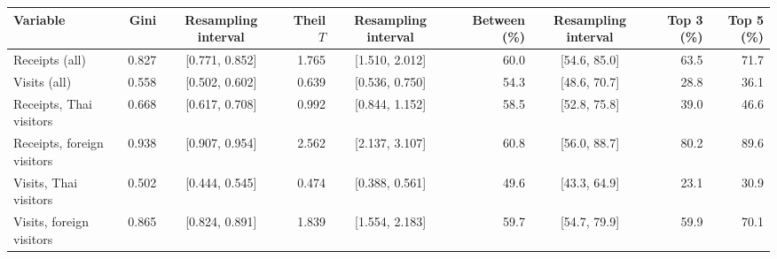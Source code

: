 \begin{tabular}{lrcrcrcrr}
\toprule
Variable & Gini & Resampling interval & Theil $T$ & Resampling interval & Between (\%) & Resampling interval & Top 3 (\%) & Top 5 (\%) \\
\midrule
Receipts (all) & 0.827 & [0.771, 0.852] & 1.765 & [1.510, 2.012] & 60.0 & [54.6, 85.0] & 63.5 & 71.7 \\
Visits (all) & 0.558 & [0.502, 0.602] & 0.639 & [0.536, 0.750] & 54.3 & [48.6, 70.7] & 28.8 & 36.1 \\
Receipts, Thai visitors & 0.668 & [0.617, 0.708] & 0.992 & [0.844, 1.152] & 58.5 & [52.8, 75.8] & 39.0 & 46.6 \\
Receipts, foreign visitors & 0.938 & [0.907, 0.954] & 2.562 & [2.137, 3.107] & 60.8 & [56.0, 88.7] & 80.2 & 89.6 \\
Visits, Thai visitors & 0.502 & [0.444, 0.545] & 0.474 & [0.388, 0.561] & 49.6 & [43.3, 64.9] & 23.1 & 30.9 \\
Visits, foreign visitors & 0.865 & [0.824, 0.891] & 1.839 & [1.554, 2.183] & 59.7 & [54.7, 79.9] & 59.9 & 70.1 \\
\bottomrule
\end{tabular}

